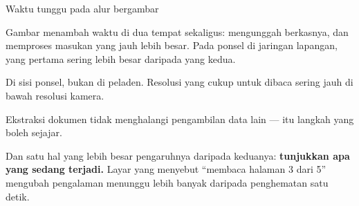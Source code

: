 \documentclass[aspectratio=169,11pt,t]{beamer}
\begin{document}
\begin{frame}[shrink=25]{Waktu tunggu pada alur bergambar}
{\fontsize{9.4}{12.6}\selectfont\color{fg2}Gambar menambah waktu di dua tempat sekaligus: mengunggah berkasnya, dan memproses masukan yang jauh lebih besar. Pada ponsel di jaringan lapangan, yang pertama sering lebih besar daripada yang kedua.\par}\vskip 4pt
\begin{minipage}[t]{0.494\textwidth}
\begin{icardgood}
Di sisi ponsel, bukan di peladen. Resolusi yang cukup untuk dibaca sering jauh di bawah resolusi kamera.
\end{icardgood}
\end{minipage}%
\hfill
\begin{minipage}[t]{0.494\textwidth}
\begin{icard}
Ekstraksi dokumen tidak menghalangi pengambilan data lain --- itu langkah yang boleh sejajar.
\end{icard}
\end{minipage}%
\begin{iband}[signal]
Dan satu hal yang lebih besar pengaruhnya daripada keduanya: \textbf{tunjukkan apa yang sedang terjadi.} Layar yang menyebut ``membaca halaman 3 dari 5'' mengubah pengalaman menunggu lebih banyak daripada penghematan satu detik.
\end{iband}
\end{frame}
\end{document}
